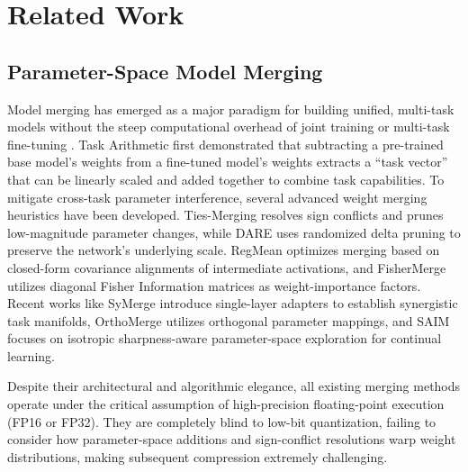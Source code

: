 \section{Related Work}
\label{sec:related}

\subsection{Parameter-Space Model Merging}
Model merging has emerged as a major paradigm for building unified, multi-task models without the steep computational overhead of joint training or multi-task fine-tuning \cite{wortsman2022model,ilharco2022editing}. Task Arithmetic \cite{ilharco2022editing} first demonstrated that subtracting a pre-trained base model's weights from a fine-tuned model's weights extracts a ``task vector'' that can be linearly scaled and added together to combine task capabilities. 
To mitigate cross-task parameter interference, several advanced weight merging heuristics have been developed. Ties-Merging \cite{yadav2023resolving} resolves sign conflicts and prunes low-magnitude parameter changes, while DARE \cite{yu2023language} uses randomized delta pruning to preserve the network's underlying scale. RegMean \cite{chohan2023regmean} optimizes merging based on closed-form covariance alignments of intermediate activations, and FisherMerge \cite{matena2022merging} utilizes diagonal Fisher Information matrices as weight-importance factors. Recent works like SyMerge \cite{kim2024symerge} introduce single-layer adapters to establish synergistic task manifolds, OrthoMerge \cite{spherelab2024orthomerge} utilizes orthogonal parameter mappings, and SAIM \cite{saim2026merge} focuses on isotropic sharpness-aware parameter-space exploration for continual learning. 

Despite their architectural and algorithmic elegance, all existing merging methods operate under the critical assumption of high-precision floating-point execution (FP16 or FP32). They are completely blind to low-bit quantization, failing to consider how parameter-space additions and sign-conflict resolutions warp weight distributions, making subsequent compression extremely challenging.

